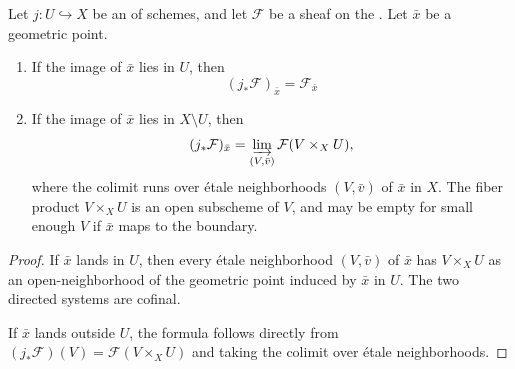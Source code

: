 \begin{proposition} \label{proposition:stalk_of_direct_image_under_open_immersion_etale_sheaf}
    Let $j : U \hookrightarrow X$ be an  of schemes, and let $\mathcal{F}$ be a sheaf on the . Let $\bar{x}$ be a geometric point.

    \begin{enumerate}
        \item If the image of $\bar{x}$ lies in $U$, then
        $$(j_*\mathcal{F})_{\bar{x}} = \mathcal{F}_{\bar{x}}$$

        \item If the image of $\bar{x}$ lies in $X \setminus U$, then
        $$(j_*\mathcal{F})_{\bar{x}} = \varinjlim_{(V, \bar{v})} \mathcal{F}(V \times_X U),$$
        where the colimit runs over étale neighborhoods $(V, \bar{v})$ of $\bar{x}$ in $X$. The fiber product $V \times_X U$ is an open subscheme of $V$, and may be empty for small enough $V$ if $\bar{x}$ maps to the boundary.
    \end{enumerate}
\end{proposition}
\begin{proof}
    If $\bar{x}$ lands in $U$, then every étale neighborhood $(V, \bar{v})$ of $\bar{x}$ has $V \times_X U$ as an open-neighborhood of the geometric point induced by $\bar{x}$ in $U$. The two directed systems are cofinal.

    If $\bar{x}$ lands outside $U$, the formula follows directly from $(j_*\mathcal{F})(V) = \mathcal{F}(V \times_X U)$ and taking the colimit over étale neighborhoods.
\end{proof}
